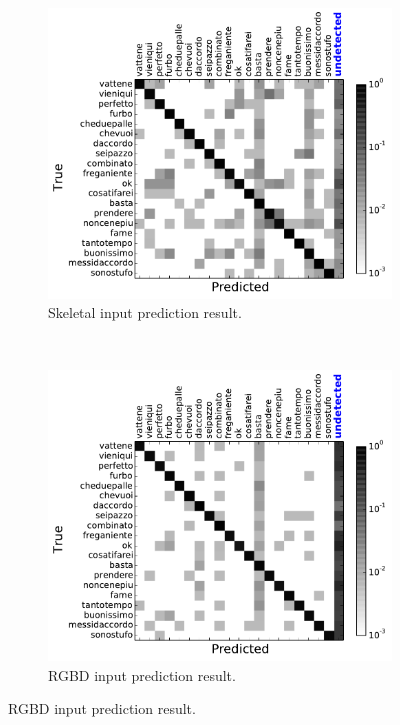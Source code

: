 \begin{figure}[t]
        \centering
        \begin{subfigure}[c]{.36\textwidth}
                \includegraphics[width=\textwidth]{images/cm/cm_sk}
                \caption{Skeletal input prediction result.}
                \label{sk_cm}
        \end{subfigure}%
        ~ %

        \begin{subfigure}[c]{0.36\textwidth}
                \includegraphics[width=\textwidth]{images/cm/cm_cnn}
                \caption{RGBD input prediction result.}
                \label{cnn_cm}
        \end{subfigure}


\end{figure}
